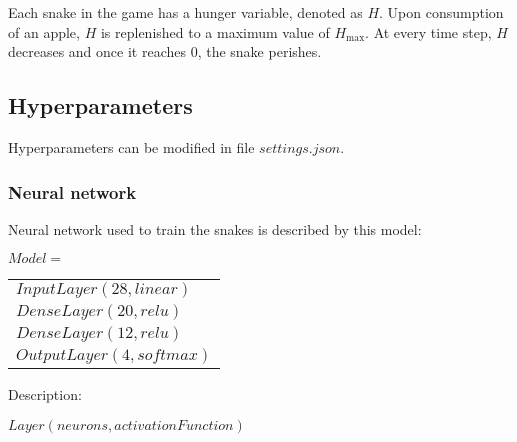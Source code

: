 Each snake in the game has a hunger variable, denoted as $H$. Upon consumption of an apple, $H$ is replenished to a maximum value of $H_{\max}$. At every time step, $H$ decreases and once it reaches $0$, the snake perishes.

\subsection{Hyperparameters}

Hyperparameters can be modified in file $settings.json$.


\subsubsection{Neural network}

Neural network used to train the snakes is described by this model:


\begin{center}
    $Model = $
    \begin{tabular}{l}
    $InputLayer(28, linear)$\\
    $DenseLayer(20, relu)$\\
    $DenseLayer(12, relu)$\\
    $OutputLayer(4, softmax)$
    \end{tabular}
\end{center}

Description:

\begin{center}
    $Layer(neurons, activationFunction)$\\
\end{center}